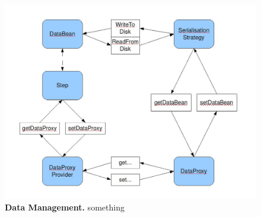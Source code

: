 \begin{figure}[htbp]
	\begin{center}
		\includegraphics[scale=0.42]{pics/programDataManagment.jpg}
	\caption[Data Management]{
	\textbf{Data Management.}
	something}
	\end{center}
	\label{fig:programDataManagment}
\end{figure}